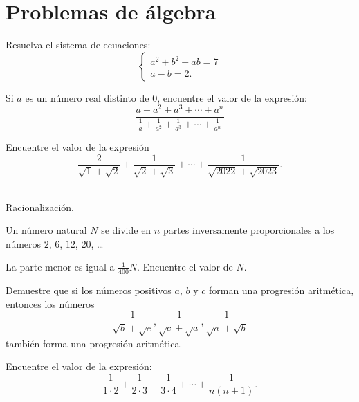 \section{Problemas de álgebra}

\begin{problem}
Resuelva el sistema de ecuaciones:
\begin{equation*}
	\begin{cases}
		a^2 + b^2 + ab = 7 \\
		a - b          = 2.
	\end{cases}
\end{equation*}
\end{problem}

\begin{problem}
Si $a$ es un número real distinto de $0$, encuentre el valor de la expresión:
\[\frac{a + a^2 + a^3 + \cdots + a^n}{\frac{1}{a} + \frac{1}{a^2} + \frac{1}{a^3} + \cdots + \frac{1}{a^n}}\]
\end{problem}

\begin{problem}
Encuentre el valor de la expresión
\[\frac2{\sqrt1 + \sqrt2} + \frac1{\sqrt2 + \sqrt3} + \cdots + \frac1{\sqrt{2022} + \sqrt{2023}}.\]
\, %
\begin{hints}

	\begin{hint}
		Racionalización.
	\end{hint}
\end{hints}
\end{problem}

\begin{problem}[OMAPA 2011/3]
Un número natural $N$ se divide en $n$ partes inversamente
proporcionales a los números $2$, $6$, $12$, $20$, \dots

La parte menor es igual a $\frac1{400}N$.
Encuentre el valor de $N$.
\end{problem}

\begin{problem}
Demuestre que si los números positivos $a$, $b$ y $c$
forman una progresión aritmética,
entonces los números
\[\frac1{\sqrt b + \sqrt c}, \frac1{\sqrt c + \sqrt a}, \frac1{\sqrt a + \sqrt b}\]
también forma una progresión aritmética.
\end{problem}

\begin{problem}
Encuentre el valor de la expresión:
\[\frac1{1\cdot2} + \frac1{2\cdot3} + \frac1{3\cdot4} + \cdots + \frac1{n(n + 1)}.\]

\end{problem}


